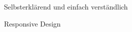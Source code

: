 \begin{frame}
\begin{block}{}
	Selbsterklärend und einfach verständlich
\end{block}
\begin{block}{}
	Responsive Design
\end{block}
\end{frame}